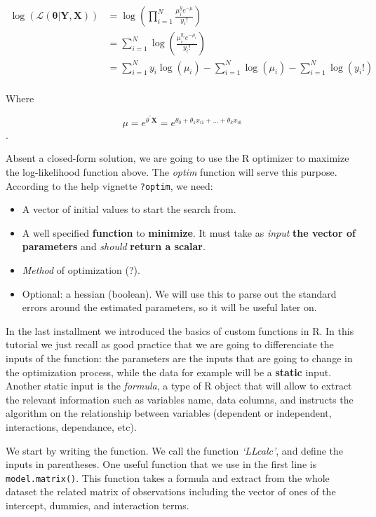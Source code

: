\documentclass[]{book}
\begin{document}
\begin{equation}
\begin{aligned}
 \log( \mathcal{L}(\boldsymbol{\theta} | \boldsymbol{Y},\boldsymbol{X}))  &= \log \left( \prod_{i=1}^N \frac{\mu_i^y e^{-\mu}}{y_i!} \right) \\
 &= \sum_{i=1}^N \log \left( \frac{\mu_i^{y_i} e^{-\mu_i}}{y_i!} \right)\\
 &= \sum_{i=1}^N y_i \log \left(\mu_i \right) - \sum_{i=1}^N \log \left(\mu_i\right) -\sum_{i=1}^N \log \left(y_i! \right)\\
\end{aligned}
\end{equation}

Where

\[ \mu = e^{\theta^{\prime} \boldsymbol{X}}=e^{\theta_0 + \theta_1 x_{i1}+ ... + \theta_k x_{ik} }\].

Absent a closed-form solution, we are going to use the R optimizer to
maximize the log-likelihood function above. The \emph{optim} function
will serve this purpose. According to the help vignette \texttt{?optim},
we need:

\begin{itemize}
\item
  A vector of initial values to start the search from.
\item
  A well specified \textbf{function} to \textbf{minimize}. It must take
  as \emph{input} \textbf{the vector of parameters} and \emph{should}
  \textbf{return a scalar}.
\item
  \emph{Method} of optimization (?).
\item
  Optional: a hessian (boolean). We will use this to parse out the
  standard errors around the estimated parameters, so it will be useful
  later on.
\end{itemize}

In the last installment we introduced the basics of custom functions in
R. In this tutorial we just recall as good practice that we are going to
differenciate the inputs of the function: the parameters are the inputs
that are going to change in the optimization process, while the data for
example will be a \textbf{static} input. Another static input is the
\emph{formula}, a type of R object that will allow to extract the
relevant information such as variables name, data columns, and instructs
the algorithm on the relationship between variables (dependent or
independent, interactions, dependance, etc).

We start by writing the function. We call the function \emph{`LLcalc'},
and define the inputs in parentheses. One useful function that we use in
the first line is \texttt{model.matrix()}. This function takes a formula
and extract from the whole dataset the related matrix of observations
including the vector of ones of the intercept, dummies, and interaction
terms.
\end{document}
